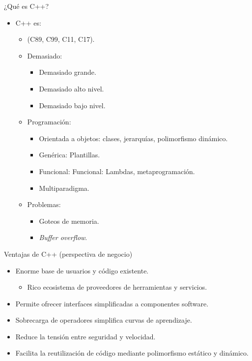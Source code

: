 \begin{frame}{¿Qué es C++?}
{\begin{itemize}
  \item C++ es:
    \begin{itemize}
      \item (C89, C99, C11, C17).
      \item Demasiado:
        \begin{itemize}
          \item Demasiado grande.
          \item Demasiado alto nivel.
          \item Demasiado bajo nivel.
        \end{itemize}
      \item Programación:
        \begin{itemize}
          \item Orientada a objetos: clases, jerarquías, polimorfismo dinámico.
          \item Genérica: Plantillas.
          \item Funcional: Funcional: Lambdas, metaprogramación.
          \item Multiparadigma.
        \end{itemize} 
      \item Problemas:
        \begin{itemize}
          \item Goteos de memoria.
          \item \emph{Buffer overflow}.
        \end{itemize}
    \end{itemize}
\end{itemize}
}
\end{frame}

\begin{frame}[t]{Ventajas de C++ (perspectiva de negocio)}
\begin{itemize}
  \item Enorme base de usuarios y código existente.
    \begin{itemize}
      \item Rico ecosistema de proveedores de herramientas y servicios.
    \end{itemize}
  \item Permite ofrecer interfaces simplificadas a componentes software.
  \item Sobrecarga de operadores simplifica curvas de aprendizaje.
  \item Reduce la tensión entre seguridad y velocidad.
  \item Facilita la reutilización de código mediante polimorfismo estático y dinámico.
\end{itemize}
\end{frame}

